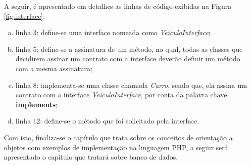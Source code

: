 A seguir, é apresentado em detalhes as linhas de código exibidas na Figura 
\ref{fig:interface}:

\begin{enumerate}[a)]
    \item linha 3: define-se uma interface nomeada como
    \textit{VeiculoInterface};
    \item linha 5: define-se a assinatura de um método, no qual, todas as
    classes que decidirem assinar um contrato com a interface deverão definir um
    método com a mesma assinatura;
    \item linha 8: implementa-se uma classe chamada \textit{Carro}, sendo que,
    ela assina um contrato com a interface \textit{VeiculoInterface}, por conta
    da palavra chave \textbf{implements};
    \item linha 12: define-se o método que foi solicitado pela interface.
\end{enumerate}

Com isto, finaliza-se o capítulo que trata sobre os conceitos de orientação a
objetos com exemplos de implementação na linguagem \acs{PHP}, a seguir será
apresentado o capítulo que tratará sobre banco de dados.
